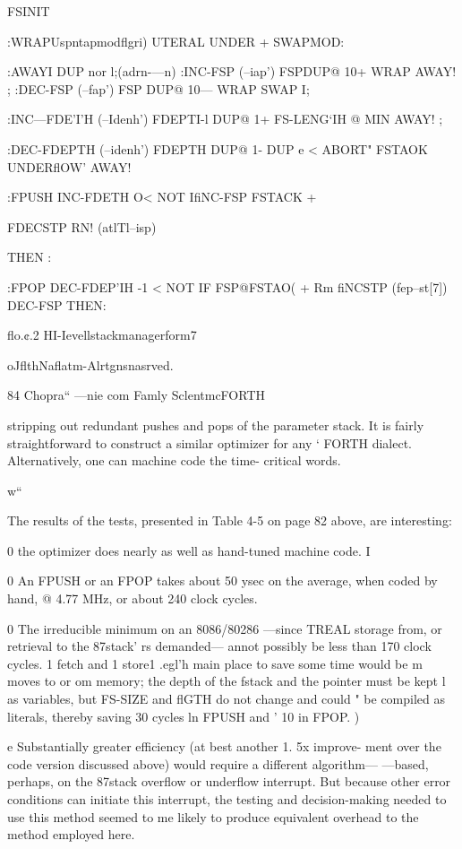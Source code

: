 {{{FSINIT

:WRAPUspntapmodflgri) \rmkeiatnckdrcuar
[flGTH@] UTERAL UNDER + SWAPMOD:

:AWAYI DUP nor l;(adrn-—n) \ueeiuieetoredwoie
:INC-FSP (--iap') FSPDUP@ 10+ WRAP AWAY! ;
:DEC-FSP (--fap') FSP DUP@ 10— WRAP SWAP I;

:INC—FDE’I'H (--Idenh')
FDEPTI-l DUP@ 1+ FS-LENG‘IH @ MIN
AWAY! ;

:DEC-FDEPTH (--idenh')
FDEPTH DUP@ 1- DUP e <
ABORT" FSTAOK UNDERflOW' AWAY!

:FPUSH INC-FDETH O< NOT
IfiNC-FSP FSTACK +

FDECSTP RN! (atlTl--isp)

THEN :

:FPOP DEC-FDEP'IH -1 < NOT
IF FSP@FSTAO( +
Rm fiNCSTP (fep--st[7])
DEC-FSP THEN:

 

 

 

flo.¢.2 HI-Ievellstackmanagerform7

oJflthNaflatm-Alrtgnsnasrved.

84 Chopra“ —nie com Famly SclentmcFORTH

stripping out redundant pushes and pops of the parameter stack.
It is fairly straightforward to construct a similar optimizer for any ‘
FORTH dialect. Alternatively, one can machine code the time-
critical words.

w“

The results of the tests, presented in Table 4-5 on page 82 above,
are interesting:

0 the optimizer does nearly as well as hand-tuned machine code. I

0 An FPUSH or an FPOP takes about 50 ysec on the average,
when coded by hand, @ 4.77 MHz, or about 240 clock cycles.

0 The irreducible minimum on an 8086/80286 —since TREAL
storage from, or retrieval to the 87stack' rs demanded— annot
possibly be less than 170 clock cycles. 1 fetch and 1 store1 .egl'h
main place to save some time would be m moves to or om
memory; the depth of the fstack and the pointer must be kept l
as variables, but FS-SIZE and flGTH do not change and could "
be compiled as literals, thereby saving 30 cycles ln FPUSH and '
10 in FPOP. )

e Substantially greater efficiency (at best another 1. 5x improve-
ment over the code version discussed above) would require a
different algorithm— —based, perhaps, on the 87stack overflow
or underflow interrupt. But because other error conditions can
initiate this interrupt, the testing and decision-making needed
to use this method seemed to me likely to produce equivalent
overhead to the method employed here.

}}}
